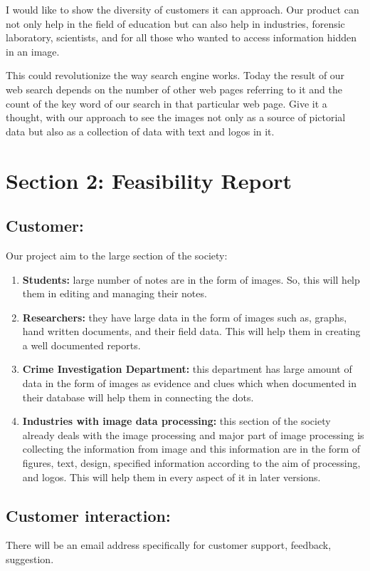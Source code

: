 \documentclass[18 pt]{article}
\begin{document}
\begin{large}
I would like to show the diversity of customers it can approach. Our product can not only help in the field of education but can also help in industries, forensic laboratory, scientists, and for all those who wanted to access information hidden in an image. 


This could revolutionize the way search engine works. Today the result of our web search depends on the number of other web pages referring to it and the count of the key word of our search in that particular web page. Give it a thought, with our approach to see the images not only as a source of pictorial data but also as a collection of data with text and logos in it. 



\section*{Section 2: Feasibility Report}
\subsection*{Customer:}
Our project aim to the large section of the society:
\begin{enumerate}
\item	\textbf{Students:} large number of notes are in the form of images. So, this will help them in editing and managing their notes.
\item	\textbf{Researchers:} they have large data in the form of images such as, graphs, hand written documents, and their field data. This will help them in creating a well documented reports.
\item	\textbf{Crime Investigation Department:} this department has large amount of data in the form of images as evidence and clues which when documented in their database will help them in connecting the dots.
\item	\textbf{Industries with image data processing:} this section of the society already deals with the image processing and major part of image processing is collecting the information from image and this information are in the form of figures, text, design, specified information according to the aim of processing, and logos. This will help them in every aspect of it in later versions.
\end{enumerate}

\subsection*{Customer interaction:} 
There will be an email address specifically for customer support, feedback, suggestion.


\end{large}
\end{document}
